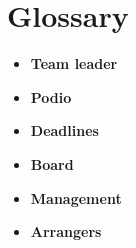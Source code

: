 \section{Glossary}
\begin{itemize}
	\item \textbf{Team leader}\\
	\item \textbf{Podio}\\
	\item \textbf{Deadlines}\\
	\item \textbf{Board}\\
	\item \textbf{Management}\\
	\item \textbf{Arrangers}\\
\end{itemize}
